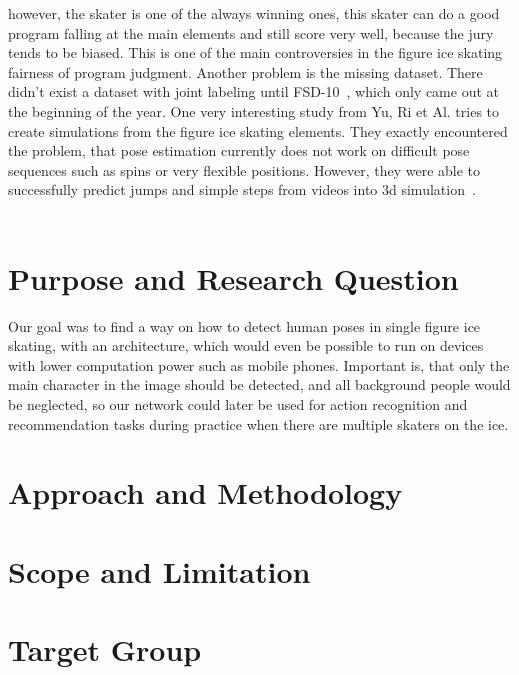     however, the skater is one of the always winning
    ones, this skater can do a good program falling at the main elements and still score very well, because the
    jury tends to be biased.
    This is one of the main controversies in the figure ice skating fairness of program judgment.
    Another problem is the missing dataset.
    There didn't exist a dataset with joint labeling until FSD-10~\cite{fsd10}, which only came out at the
    beginning of the year.
    One very interesting study from Yu, Ri et Al. tries to create simulations from the figure ice skating elements.
    They exactly encountered the problem, that pose estimation currently does not work on difficult pose sequences
    such as spins or very flexible positions.
    However, they were able to successfully predict jumps and simple steps from videos into 3d
    simulation~\cite{simplebaselines}.
\\\mbox{}\\
    \section{Purpose and Research Question}
    Our goal was to find a way on how to detect human poses in single figure ice skating, with an architecture, which would even
    be possible to run on devices with lower computation power such as mobile phones.
    Important is, that only the main character in the image should be detected, and all background people would be
    neglected, so our network could later be used for action recognition and recommendation tasks during practice when
    there are multiple skaters on the ice.

\section{Approach and Methodology}
\section{Scope and Limitation}
\section{Target Group}

